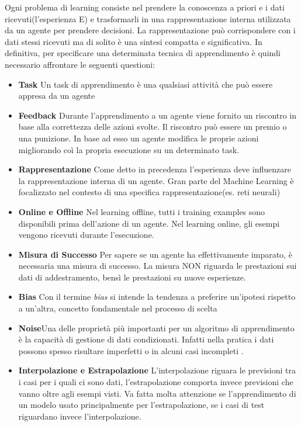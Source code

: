 Ogni problema di learning consiste nel prendere la conoscenza a priori e i dati ricevuti(l'esperienza E) e 
trasformarli in una rappresentazione  interna utilizzata da un agente per prendere decisioni. La rappresentazione
può corrispondere con i dati stessi ricevuti ma di solito è una sintesi compatta e significativa. 
In definitiva, per specificare una determinata tecnica di apprendimento è quindi necessario affrontare le seguenti\cite{PooleMackworth17} questioni:
\begin{itemize}
  \item \textbf{Task} Un task di apprendimento è una qualsiasi attività che può essere appresa da un agente
  \item \textbf{Feedback} Durante l'apprendimento a un agente viene fornito un riscontro in base alla correttezza delle azioni svolte. Il riscontro può essere un premio o una punizione.  In base ad esso un agente modifica le proprie azioni
  migliorando coì la propria esecuzione su un determinato task.
  \item \textbf{Rappresentazione} Come detto in precedenza l'esperienza deve influenzare la rappresentazione interna di un agente.
  Gran parte del Machine Learning è focalizzato nel contesto di una specifica rappresentazione(es. reti neurali)
  \item \textbf{Online e Offline} Nel learning offline, tutti i training examples sono disponibili prima dell'azione di un agente. Nel learning online,
  gli esempi vengono ricevuti durante l'esecuzione.
  \item \textbf{Misura di Successo} Per sapere se un agente ha effettivamente imparato, è necessaria una misura di successo. La misura NON riguarda le prestazioni sui dati di addestramento, bensì le prestazioni su nuove esperienze.
  \item \textbf{Bias} Con il termine \emph{bias} si intende la tendenza a preferire un'ipotesi rispetto a un'altra, concetto fondamentale nel processo di scelta
  \item \textbf{Noise}Una delle proprietà più importanti per un algoritmo di apprendimento è la capacità di gestione di dati condizionati.
  Infatti nella pratica i dati possono spesso risultare imperfetti o in alcuni casi incompleti .
  \item \textbf{Interpolazione e Estrapolazione} L'interpolazione riguara le previsioni tra i  casi per i quali ci sono dati, l'estrapolazione comporta invece 
  previsioni che vanno oltre agli esempi visti. Va fatta molta attenzione se l'apprendimento di un modelo usato principalmente per l'estrapolazione, se i casi di test riguardano invece l'interpolazione.
\end{itemize}
